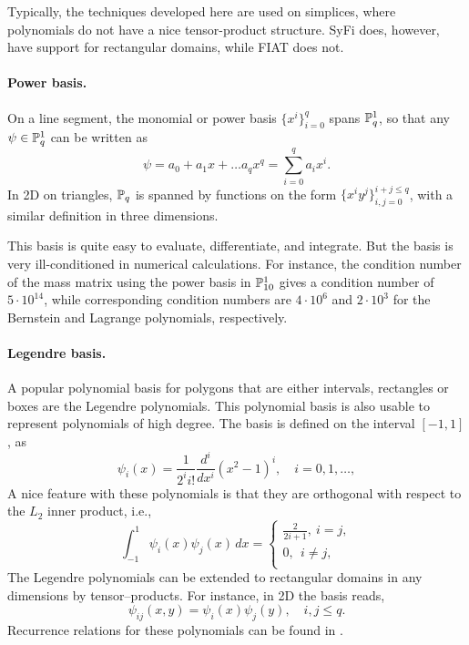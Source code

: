 Typically, the techniques developed  here
are used on simplices, where polynomials do not have a nice
tensor-product structure.  
SyFi does, however, have support for rectangular domains, while  FIAT does not.

\paragraph{Power basis.}
On a line segment, the monomial or power basis 
\( \{ x^i \}_{i=0}^{q} \) spans  $\P^1_q$,  so that any \( \psi \in \P^1_q \) can be written as
\begin{equation}
\label{pn1d}
\psi = a_0 + a_1 x + \ldots a_q x^q = \sum^q_{i=0} a_i x^i.
\end{equation}
In 2D on triangles, $\P_q$ is spanned by functions on the form
\( \{ x^i y^j \}_{i,j=0}^{i+j\leq q} \), with a similar definition in
three dimensions.

This basis is quite easy to evaluate, differentiate, and
integrate. But the basis is very ill-conditioned in numerical calculations.
For instance, the condition number of the mass matrix using
the power basis in $\P^1_{10}$ gives a condition number of $5\cdot10^{14}$, 
while corresponding condition numbers are $4\cdot 10^6$ and $2\cdot 10^3$ 
for the Bernstein and Lagrange polynomials, respectively.    

\paragraph{Legendre basis.}

A popular polynomial basis for polygons that are either intervals, rectangles or boxes are the Legendre polynomials.
This polynomial basis is also usable to represent polynomials of high degree.
The basis is defined on the interval $[-1,1]$, as
\begin{equation}
\psi_i(x) = \frac{1}{2^i i!} \frac{d^i}{dx^i} (x^2 -1)^i, \quad i=0,1,\ldots,
\end{equation}
A nice feature with these polynomials is that they are orthogonal
with respect to the $L_2$ inner product, i.e.,
\begin{equation}
\int_{-1}^1 \psi_i (x) \psi_j(x) \, dx  =
\left\{
\begin{array}{c}
\frac{2}{2i+1}, \ i=j, \\
0 , \ \ i\not= j, \\
\end{array}
\right.
\end{equation}
The Legendre polynomials can be extended to rectangular domains in any dimensions by tensor--products. 
For instance, in 2D the basis reads, 
\begin{equation}
\psi_{ij}(x,y) = \psi_i(x) \psi_j(y) ,   \quad i,j \leq q. 
\end{equation}
Recurrence relations for these polynomials can be found in \citet{KarniadakisSherwin2005}.  

